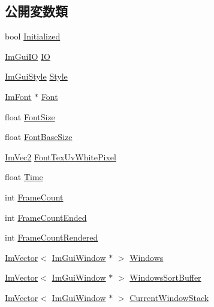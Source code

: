 \subsection*{公開変数類}
\begin{DoxyCompactItemize}
\item 
bool \mbox{\hyperlink{struct_im_gui_context_a71b32432f5c4658b4772b293640a66c0}{Initialized}}
\item 
\mbox{\hyperlink{struct_im_gui_i_o}{Im\+Gui\+IO}} \mbox{\hyperlink{struct_im_gui_context_add4fdcc8c6a437d8f8e7c837418be83c}{IO}}
\item 
\mbox{\hyperlink{struct_im_gui_style}{Im\+Gui\+Style}} \mbox{\hyperlink{struct_im_gui_context_a2e682502e1a3d2c399171dd3c4fc969d}{Style}}
\item 
\mbox{\hyperlink{struct_im_font}{Im\+Font}} $\ast$ \mbox{\hyperlink{struct_im_gui_context_aec64e774018a7d74515baeb9e06fb4e3}{Font}}
\item 
float \mbox{\hyperlink{struct_im_gui_context_af4022d1866887cdc400131fc6a65b200}{Font\+Size}}
\item 
float \mbox{\hyperlink{struct_im_gui_context_a0fcbda57d25b80111283ed7305ee3ee8}{Font\+Base\+Size}}
\item 
\mbox{\hyperlink{struct_im_vec2}{Im\+Vec2}} \mbox{\hyperlink{struct_im_gui_context_a39aec37f209c91a4e4f503bd2e365081}{Font\+Tex\+Uv\+White\+Pixel}}
\item 
float \mbox{\hyperlink{struct_im_gui_context_a88ebae89e11da57e4567767694f7576f}{Time}}
\item 
int \mbox{\hyperlink{struct_im_gui_context_ab9a1f3b3f15f0a6c5f29aef85f1a8ea2}{Frame\+Count}}
\item 
int \mbox{\hyperlink{struct_im_gui_context_aa4cc3099c789be981d665c617b6d78a9}{Frame\+Count\+Ended}}
\item 
int \mbox{\hyperlink{struct_im_gui_context_a64a96ecd43f4b10c1fec8eb3fc9bff89}{Frame\+Count\+Rendered}}
\item 
\mbox{\hyperlink{class_im_vector}{Im\+Vector}}$<$ \mbox{\hyperlink{struct_im_gui_window}{Im\+Gui\+Window}} $\ast$ $>$ \mbox{\hyperlink{struct_im_gui_context_a0f59a9a861d097be066c6cc106e40f3e}{Windows}}
\item 
\mbox{\hyperlink{class_im_vector}{Im\+Vector}}$<$ \mbox{\hyperlink{struct_im_gui_window}{Im\+Gui\+Window}} $\ast$ $>$ \mbox{\hyperlink{struct_im_gui_context_af33de778de28b057fa7a42e4cbe0017a}{Windows\+Sort\+Buffer}}
\item 
\mbox{\hyperlink{class_im_vector}{Im\+Vector}}$<$ \mbox{\hyperlink{struct_im_gui_window}{Im\+Gui\+Window}} $\ast$ $>$ \mbox{\hyperlink{struct_im_gui_context_a19020a20e7bca2fadbb287106b92891b}{Current\+Window\+Stack}}

\end{DoxyCompactItemize}
